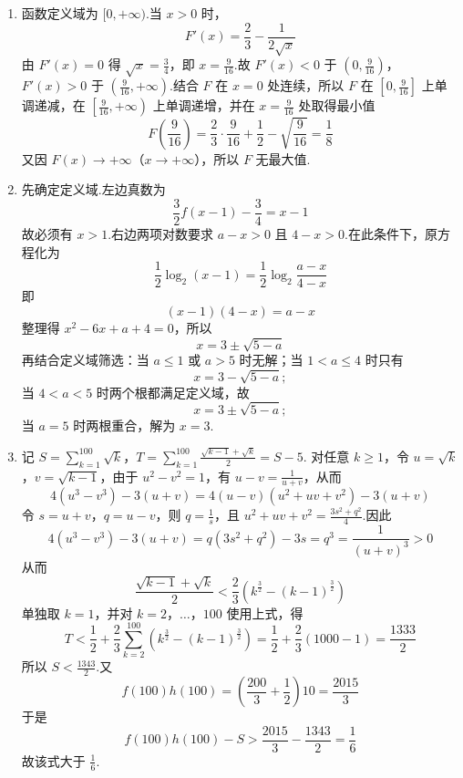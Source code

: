 \begin{solution}
\begin{enumerate}
\item 函数定义域为 \([0,+\infty)\).当 \(x>0\) 时，
\[
F'(x)=\frac23-\frac{1}{2\sqrt{x}}
\]
由 \(F'(x)=0\) 得 \(\sqrt{x}=\frac34\)，即 \(x=\frac9{16}\).故 \(F'(x)<0\) 于 \(\left(0,\frac9{16}\right)\)，\(F'(x)>0\) 于 \(\left(\frac9{16},+\infty\right)\).结合 \(F\) 在 \(x=0\) 处连续，所以 \(F\) 在 \(\left[0,\frac9{16}\right]\) 上单调递减，在 \(\left[\frac9{16},+\infty\right)\) 上单调递增，并在 \(x=\frac9{16}\) 处取得最小值
\[
F\left(\frac9{16}\right)=\frac23\cdot\frac9{16}+\frac12-\sqrt{\frac9{16}}=\frac18
\]
又因 \(F(x)\to+\infty\)（\(x\to+\infty\)），所以 \(F\) 无最大值.

\item 先确定定义域.左边真数为
\[
\frac32f(x-1)-\frac34=x-1
\]
故必须有 \(x>1\).右边两项对数要求 \(a-x>0\) 且 \(4-x>0\).在此条件下，原方程化为
\[
\frac12\log_2(x-1)=\frac12\log_2\frac{a-x}{4-x}
\]
即
\[
(x-1)(4-x)=a-x
\]
整理得 \(x^2-6x+a+4=0\)，所以
\[
x=3\pm\sqrt{5-a}
\]
再结合定义域筛选：当 \(a\leqslant1\) 或 \(a>5\) 时无解；当 \(1<a\leqslant4\) 时只有
\[
x=3-\sqrt{5-a};
\]
当 \(4<a<5\) 时两个根都满足定义域，故
\[
x=3\pm\sqrt{5-a};
\]
当 \(a=5\) 时两根重合，解为 \(x=3\).

\item 记
\(S=\sum_{k=1}^{100}\sqrt{k}\)，\(T=\sum_{k=1}^{100}\frac{\sqrt{k-1}+\sqrt{k}}{2}=S-5\).
对任意 \(k\geqslant1\)，令 \(u=\sqrt{k}\)，\(v=\sqrt{k-1}\)，由于 \(u^2-v^2=1\)，有 \(u-v=\frac{1}{u+v}\)，从而
\[
4(u^3-v^3)-3(u+v)=4(u-v)(u^2+uv+v^2)-3(u+v)
\]
令 \(s=u+v\)，\(q=u-v\)，则 \(q=\frac{1}{s}\)，且 \(u^2+uv+v^2=\frac{3s^2+q^2}{4}\).因此
\[
4(u^3-v^3)-3(u+v)=q(3s^2+q^2)-3s=q^3=\frac{1}{(u+v)^3}>0
\]
从而
\[
\frac{\sqrt{k-1}+\sqrt{k}}2<\frac23\left(k^{\frac{3}{2}}-(k-1)^{\frac{3}{2}}\right)
\]
单独取 \(k=1\)，并对 \(k=2\)，\(\ldots\)，\(100\) 使用上式，得
\[
T<\frac12+\frac23\sum_{k=2}^{100}\left(k^{\frac{3}{2}}-(k-1)^{\frac{3}{2}}\right)
 =\frac12+\frac23(1000-1)=\frac{1333}{2}
\]
所以 \(S<\frac{1343}{2}\).又
\[
f(100)h(100)=\left(\frac{200}{3}+\frac12\right)10=\frac{2015}{3}
\]
于是
\[
f(100)h(100)-S>\frac{2015}{3}-\frac{1343}{2}=\frac16
\]
故该式大于 \(\frac16\).
\end{enumerate}
\end{solution}
